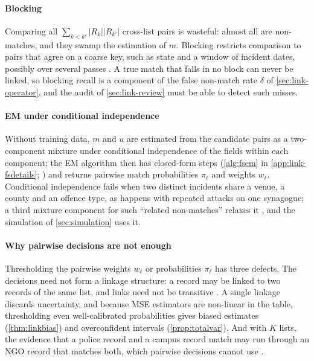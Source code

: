 \paragraph{Blocking}
Comparing all $\sum_{k<k'}|R_k||R_{k'}|$ cross-list pairs is wasteful: almost all are non-matches, and they swamp the estimation of $m$. Blocking restricts comparison to pairs that agree on a coarse key, such as state and a window of incident dates, possibly over several passes \citep{christen2012,herzog2007}. A true match that falls in no block can never be linked, so blocking recall is a component of the false non-match rate $\delta$ of \cref{sec:link-operator}, and the audit of \cref{sec:link-review} must be able to detect such misses.

\paragraph{EM under conditional independence}
Without training data, $m$ and $u$ are estimated from the candidate pairs as a two-component mixture under conditional independence of the fields within each component; the EM algorithm then has closed-form steps (\cref{alg:fsem} in \cref{app:link-fsdetails}; \citealp{winkler1988,jaro1989,enamorado2019}) and returns pairwise match probabilities $\pi_\ell$ and weights $w_\ell$. Conditional independence fails when two distinct incidents share a venue, a county and an offence type, as happens with repeated attacks on one synagogue; a third mixture component for such ``related non-matches'' relaxes it \citep{larsen2001}, and the simulation of \cref{sec:simulation} uses it.

\paragraph{Why pairwise decisions are not enough}
Thresholding the pairwise weights $w_\ell$ or probabilities $\pi_\ell$ has three defects. The decisions need not form a linkage structure: a record may be linked to two records of the same list, and links need not be transitive \citep{jaro1989,sadinle2013}. A single linkage discards uncertainty, and because MSE estimators are non-linear in the table, thresholding even well-calibrated probabilities gives biased estimates (\cref{thm:linkbias}) and overconfident intervals (\cref{prop:totalvar}). And with $K$ lists, the evidence that a police record and a campus record match may run through an NGO record that matches both, which pairwise decisions cannot use \citep{sadinle2013}.

